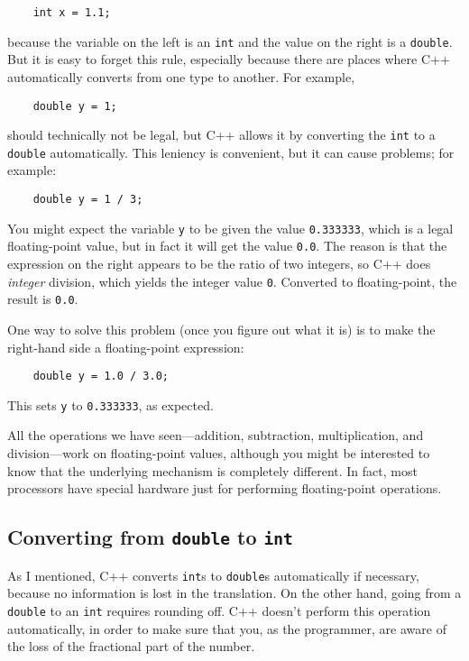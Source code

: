 \begin{lstlisting}
    int x = 1.1;
\end{lstlisting}
%
because the variable on the left is an {\tt int}
and the value on the right is a {\tt double}.  But it is easy
to forget this rule, especially because there are places where C++
automatically converts from one type to another.
For example,

\begin{lstlisting}
    double y = 1;
\end{lstlisting}
%
should technically not be legal, but C++ allows it by converting the
{\tt int} to a {\tt double} automatically.  This leniency is
convenient, but it can cause problems; for example:

\begin{lstlisting}
    double y = 1 / 3;
\end{lstlisting}
%
You might expect the variable {\tt y} to be given the value
{\tt 0.333333}, which is a legal floating-point value, but in
fact it will get the value {\tt 0.0}.  The reason is that the
expression on the right appears to be the ratio of two integers,
so C++ does {\em integer} division, which yields the integer
value {\tt 0}.  Converted to floating-point, the result is
{\tt 0.0}.

One way to solve this problem (once you figure out what
it is) is to make the right-hand side a floating-point
expression:

\begin{lstlisting}
    double y = 1.0 / 3.0;
\end{lstlisting}
%
This sets {\tt y} to {\tt 0.333333}, as expected.


All the operations we have seen---addition, subtraction,
multiplication, and division---work on floating-point values,
although you might be interested to know that the underlying mechanism
is completely different.  In fact, most processors have special
hardware just for performing floating-point operations.

\subsection{Converting from {\tt double} to {\tt int}}
\label{rounding}

As I mentioned, C++ converts {\tt int}s
to {\tt double}s automatically if necessary, because no
information is lost in the translation.  On the other hand,
going from a {\tt double} to an {\tt int} requires rounding
off.  C++ doesn't perform this operation automatically, in
order to make sure that you, as the programmer, are aware
of the loss of the fractional part of the number.

